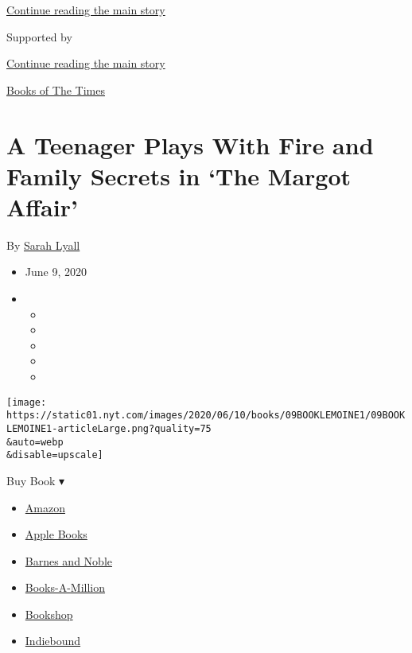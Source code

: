 \protect\hyperlink{after-top}{Continue reading the main story}

Supported by

\protect\hyperlink{after-sponsor}{Continue reading the main story}

\href{/column/books-of-the-times}{Books of The Times}

\hypertarget{a-teenager-plays-with-fire-and-family-secrets-in-the-margot-affair}{%
\section{A Teenager Plays With Fire and Family Secrets in `The Margot
Affair'}\label{a-teenager-plays-with-fire-and-family-secrets-in-the-margot-affair}}

By \href{https://www.nytimes.com/by/sarah-lyall}{Sarah Lyall}

\begin{itemize}
\item
  June 9, 2020
\item
  \begin{itemize}
  \item
  \item
  \item
  \item
  \item
  \end{itemize}
\end{itemize}

\texttt{[image: https://static01.nyt.com/images/2020/06/10/books/09BOOKLEMOINE1/09BOOKLEMOINE1-articleLarge.png?quality=75\\\&auto=webp\\\&disable=upscale]}

Buy Book ▾

\begin{itemize}
\tightlist
\item
  \href{https://www.amazon.com/gp/search?index=books\&tag=NYTBSREV-20\&field-keywords=The+Margot+Affair+Sana\%C3\%AB+Lemoine}{Amazon}
\item
  \href{https://du-gae-books-dot-nyt-du-prd.appspot.com/buy?title=The+Margot+Affair\&author=Sana\%C3\%AB+Lemoine}{Apple
  Books}
\item
  \href{https://www.anrdoezrs.net/click-7990613-11819508?url=https\%3A\%2F\%2Fwww.barnesandnoble.com\%2Fw\%2F\%3Fean\%3D9781984854438}{Barnes
  and Noble}
\item
  \href{https://www.anrdoezrs.net/click-7990613-35140?url=https\%3A\%2F\%2Fwww.booksamillion.com\%2Fp\%2FThe\%2BMargot\%2BAffair\%2FSana\%25C3\%25AB\%2BLemoine\%2F9781984854438}{Books-A-Million}
\item
  \href{https://bookshop.org/a/3546/9781984854438}{Bookshop}
\item
  \href{https://www.indiebound.org/book/9781984854438?aff=NYT}{Indiebound}
\end{itemize}


